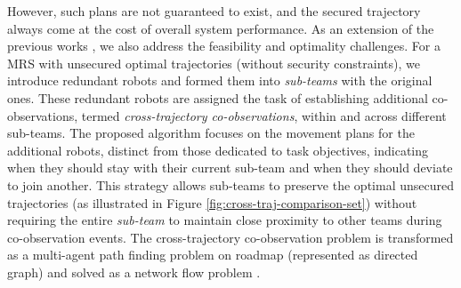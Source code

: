 \documentclass[10pt,twocolumn,twoside]{IEEEtran}
\begin{document}
However, such plans are not guaranteed to exist, and the secured trajectory always come at the cost of overall system performance. As an extension of the previous works \cite{yang2020multi,yang2021multi}, we also address the feasibility and optimality challenges. For a MRS with unsecured optimal trajectories (without security constraints), we introduce redundant robots and formed them into \emph{sub-teams} with the original ones. These redundant robots are assigned the task of establishing additional co-observations, termed \emph{cross-trajectory co-observations}, within and across different sub-teams. The proposed algorithm focuses on the movement plans for the additional robots, distinct from those dedicated to task objectives, indicating when they should stay with their current sub-team and when they should deviate to join another. This strategy allows sub-teams to preserve the optimal unsecured trajectories (as illustrated in Figure \ref{fig:cross-traj-comparison-set}) without requiring the entire \emph{sub-team} to maintain close proximity to other teams during co-observation events. The cross-trajectory co-observation problem is transformed as a multi-agent path finding problem on roadmap (represented as directed graph) and solved as a network flow problem \cite{yu2013multi}.
\end{document}
